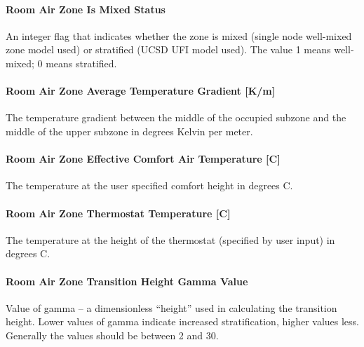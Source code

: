 \paragraph{\texorpdfstring{Room Air Zone Is Mixed Status \protect\hyperlink{section-1}{}}{Room Air Zone Is Mixed Status }}\label{room-air-zone-is-mixed-status-1}

An integer flag that indicates whether the zone is mixed (single node well-mixed zone model used) or stratified (UCSD UFI model used). The value 1 means well-mixed; 0 means stratified.

\paragraph{Room Air Zone Average Temperature Gradient {[}K/m{]}}\label{room-air-zone-average-temperature-gradient-km-1}

The temperature gradient between the middle of the occupied subzone and the middle of the upper subzone in degrees Kelvin per meter.

\paragraph{Room Air Zone Effective Comfort Air Temperature {[}C{]}}\label{room-air-zone-effective-comfort-air-temperature-c}

The temperature at the user specified comfort height in degrees C.

\paragraph{Room Air Zone Thermostat Temperature {[}C{]}}\label{room-air-zone-thermostat-temperature-c-1}

The temperature at the height of the thermostat (specified by user input) in degrees C.

\paragraph{\texorpdfstring{Room Air Zone Transition Height Gamma Value \protect\hyperlink{section-1}{}}{Room Air Zone Transition Height Gamma Value }}\label{room-air-zone-transition-height-gamma-value}

Value of gamma -- a dimensionless ``height'' used in calculating the transition height. Lower values of gamma indicate increased stratification, higher values less. Generally the values should be between 2 and 30.

